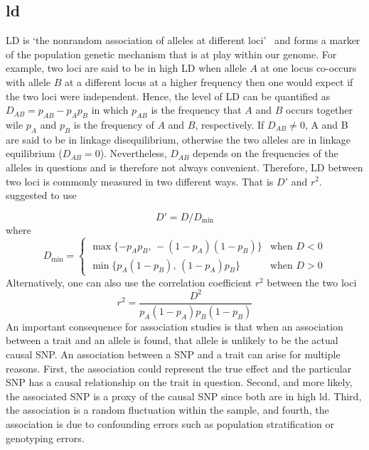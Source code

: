 \subsection{\acrfull{ld}}
\label{sub:linkage_disequilibrium}

LD is `the nonrandom association of alleles at different loci'~\cite{Slatkin2008} and forms a marker of the population genetic mechanism that is at play within our genome.
For example, two loci are said to be in high LD when allele $A$ at one locus co-occurs with allele $B$ at a different locus at a higher frequency then one would expect if the two loci were independent.
Hence, the level of LD can be quantified as $D_{AB}=p_{AB}-p_{A}p_{B}$ in which $p_{AB}$ is the frequency that $A$ and $B$ occurs together wile $p_A$ and $p_B$ is the frequency of $A$ and $B$, respectively.
If $D_{AB} \neq 0$, A and B are said to be in linkage disequilibrium, otherwise the two alleles are in linkage equilibrium ($D_{AB}=0$).
Nevertheless, $D_{AB}$ depends on the frequencies of the alleles in questions and is therefore not always convenient.
Therefore, LD between two loci is commonly measured in two different ways. 
That is $D'$ and $r^2$.
\citet{Lewontin1964} suggested to use

\begin{equation}\label{eq:dprime}
  D' = D/D_{\min}
\end{equation}
where 
\begin{equation*}
  D_{\min}= \begin{cases}
    \max\{-p_A p_B,\,-(1-p_A)(1-p_B)\} & \text{when } D < 0\\
    \min\{p_A (1-p_B),\,(1-p_A) p_B\} & \text{when } D > 0
  \end{cases} 
\end{equation*}
Alternatively, one can also use the correlation coefficient $r^2$ between the two loci 
\begin{equation}\label{eq:r2}
  r^2=\frac{D^2}{p_A(1-p_A)p_B (1-p_B)}
\end{equation}
An important consequence for association studies is that when an association between a trait and an allele is found, that allele is unlikely to be the actual causal SNP\@.
An association between a SNP and a trait can arise for multiple reasons.
First, the association could represent the true effect and the particular SNP has a causal relationship on the trait in question.
Second, and more likely, the associated SNP is a proxy of the causal SNP since both are in high \acrshort{ld}.
Third, the association is a random fluctuation within the sample, and 
fourth, the association is due to confounding errors such as population stratification or genotyping errors.

